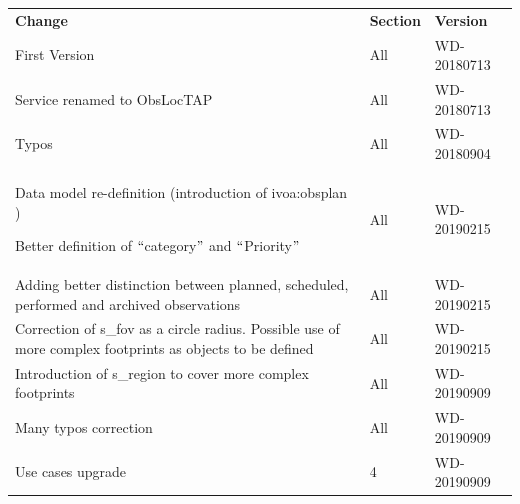 \documentclass[11pt,a4paper]{ivoa}
\begin{document}
\begin{table}[H]
 			\centering
\begin{tabular}{p{3.75in}p{0.92in}p{0.8in}}
\hline
\multicolumn{1}{|p{3.75in}}{\textbf{Change}} &
\multicolumn{1}{|p{0.72in}}{\textbf{Section}} &
\multicolumn{1}{|p{0.9in}|}{\textbf{Version}} \\
\multicolumn{1}{|p{3.75in}}{First Version} &
\multicolumn{1}{|p{0.72in}}{All} &
\multicolumn{1}{|p{0.9in}|}{{\fontsize{10pt}{12.0pt}\selectfont WD-20180713}} \\
\multicolumn{1}{|p{3.75in}}{Service renamed to ObsLocTAP} &
\multicolumn{1}{|p{0.72in}}{All} &
\multicolumn{1}{|p{0.9in}|}{{\fontsize{10pt}{12.0pt}\selectfont WD-20180713}} \\
\multicolumn{1}{|p{3.75in}}{Typos} &
\multicolumn{1}{|p{0.72in}}{All} &
\multicolumn{1}{|p{0.9in}|}{{\fontsize{10pt}{12.0pt}\selectfont WD-20180904}} \\
\multicolumn{1}{|p{3.75in}}{Data model re-definition (introduction of ivoa:obsplan ) \par Better definition of $``$category$"$  and $``$Priority$"$ } &
\multicolumn{1}{|p{0.72in}}{All} &
\multicolumn{1}{|p{0.9in}|}{{\fontsize{10pt}{12.0pt}\selectfont WD-20190215}} \\
\multicolumn{1}{|p{3.75in}}{Adding better distinction between planned, scheduled, performed and archived observations} &
\multicolumn{1}{|p{0.72in}}{All} &
\multicolumn{1}{|p{0.9in}|}{{\fontsize{10pt}{12.0pt}\selectfont WD-20190215}} \\
\multicolumn{1}{|p{3.75in}}{Correction of s\_fov as a circle radius. Possible use of more complex footprints as objects to be defined} &
\multicolumn{1}{|p{0.72in}}{All} &
\multicolumn{1}{|p{0.9in}|}{{\fontsize{10pt}{12.0pt}\selectfont WD-20190215}} \\
\multicolumn{1}{|p{3.75in}}{Introduction of s\_region to cover more complex footprints} &
\multicolumn{1}{|p{0.72in}}{All} &
\multicolumn{1}{|p{0.9in}|}{{\fontsize{10pt}{12.0pt}\selectfont WD-20190909}} \\
\multicolumn{1}{|p{3.75in}}{Many typos correction} &
\multicolumn{1}{|p{0.72in}}{All} &
\multicolumn{1}{|p{0.9in}|}{{\fontsize{10pt}{12.0pt}\selectfont WD-20190909}} \\
\multicolumn{1}{|p{3.75in}}{Use cases upgrade} &
\multicolumn{1}{|p{0.72in}}{4} &
\multicolumn{1}{|p{0.9in}|}{{\fontsize{10pt}{12.0pt}\selectfont WD-20190909}} \\

\end{tabular}
\end{table}
\end{document}
